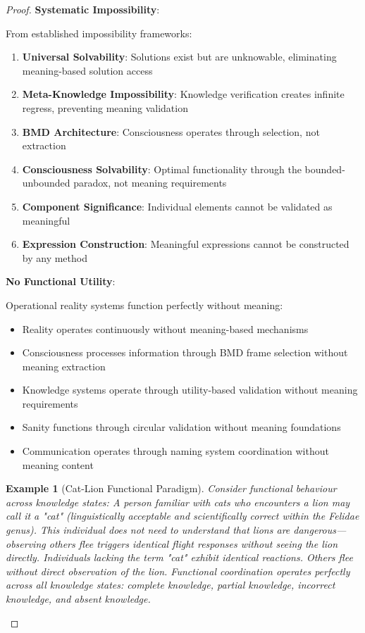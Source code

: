 \documentclass[12pt,a4paper]{article}
\newtheorem{example}{Example}
\begin{document}
\begin{proof}
\textbf{Systematic Impossibility}:

From established impossibility frameworks:
\begin{enumerate}
\item \textbf{Universal Solvability}: Solutions exist but are unknowable, eliminating meaning-based solution access
\item \textbf{Meta-Knowledge Impossibility}: Knowledge verification creates infinite regress, preventing meaning validation
\item \textbf{BMD Architecture}: Consciousness operates through selection, not extraction
\item \textbf{Consciousness Solvability}: Optimal functionality through the bounded-unbounded paradox, not meaning requirements
\item \textbf{Component Significance}: Individual elements cannot be validated as meaningful
\item \textbf{Expression Construction}: Meaningful expressions cannot be constructed by any method
\end{enumerate}

\textbf{No Functional Utility}:

Operational reality systems function perfectly without meaning:
\begin{itemize}
\item Reality operates continuously without meaning-based mechanisms
\item Consciousness processes information through BMD frame selection without meaning extraction
\item Knowledge systems operate through utility-based validation without meaning requirements
\item Sanity functions through circular validation without meaning foundations
\item Communication operates through naming system coordination without meaning content
\end{itemize}

\begin{example}[Cat-Lion Functional Paradigm]
Consider functional behaviour across knowledge states: A person familiar with cats who encounters a lion may call it a "cat" (linguistically acceptable and scientifically correct within the Felidae genus). This individual does not need to understand that lions are dangerous—observing others flee triggers identical flight responses without seeing the lion directly. Individuals lacking the term "cat" exhibit identical reactions. Others flee without direct observation of the lion. Functional coordination operates perfectly across all knowledge states: complete knowledge, partial knowledge, incorrect knowledge, and absent knowledge.
\end{example}


\end{proof}
\end{document}
